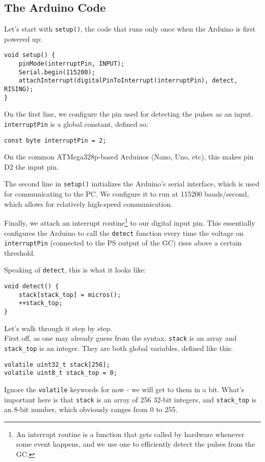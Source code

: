 \documentclass[11pt]{article}
\begin{document}
\subsection{The Arduino Code}
\label{sec:orgea08e1a}
Let's start with \texttt{setup()}, the code that runs only once when the Arduino is first powered up:
\begin{verbatim}
void setup() {
    pinMode(interruptPin, INPUT);
    Serial.begin(115200);
    attachInterrupt(digitalPinToInterrupt(interruptPin), detect, RISING);
}
\end{verbatim}
On the first line, we configure the pin used for detecting the pulses as an input. \texttt{interruptPin} is a global constant, defined so:
\begin{verbatim}
const byte interruptPin = 2;
\end{verbatim}
On the common ATMega328p-based Arduinos (Nano, Uno, etc), this makes pin D2 the input pin.

The second line in \texttt{setup()} initializes the Arduino's serial interface, which is used for communicating to the PC. We configure it to run at 115200 bauds/second, which allows for relatively high-speed communication.

Finally, we attach an interrupt routine\footnote{An interrupt routine is a function that gets called by hardware whenever some event happens, and we use one to efficiently detect the pulses from the GC.} to our digital input pin. This essentially configures the Arduino to call the \texttt{detect} function every time the voltage on \texttt{interruptPin} (connected to the PS output of the GC) rises above a certain threshold. 

Speaking of \texttt{detect}, this is what it looks like:

\begin{verbatim}
void detect() {
    stack[stack_top] = micros();
    ++stack_top;
}
\end{verbatim}

Let's walk through it step by step.\\
First off, as one may already guess from the syntax, \texttt{stack} is an array and \texttt{stack\_top} is an integer. They are both global variables, defined like this:

\begin{verbatim}
volatile uint32_t stack[256];
volatile uint8_t stack_top = 0;
\end{verbatim}

Ignore the \texttt{volatile} keywords for now - we will get to them in a bit. What's important here is that \texttt{stack} is an array of 256 32-bit integers, and \texttt{stack\_top} is an 8-bit number, which obviously ranges from 0 to 255.
\end{document}
